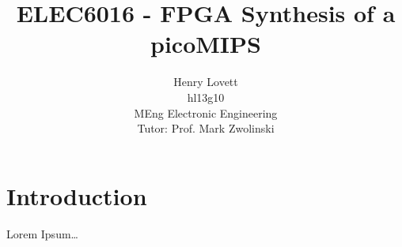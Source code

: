 \documentclass[12pt]{article}
\author{Henry Lovett \\ hl13g10 \\ MEng Electronic Engineering \\ Tutor: Prof. Mark Zwolinski}
\title{ELEC6016 - FPGA Synthesis of a picoMIPS}
\begin{document}
\maketitle


\section{Introduction}
Lorem Ipsum\dots
\end{document}
